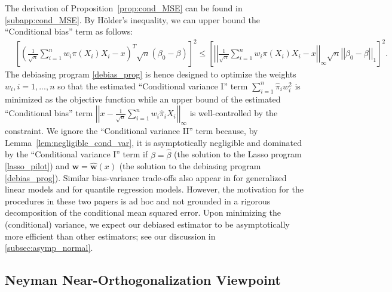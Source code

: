 \documentclass[ejsv2,noshowframe]{imsart}
\theoremstyle{plain}
\theoremstyle{definition}
\theoremstyle{remark}
\newcommand{\norm}[1]{\left|\left| #1 \right|\right|}
\renewcommand{\hat}{\widehat}
\begin{document}
The derivation of Proposition~\ref{prop:cond_MSE} can be found in \autoref{subapp:cond_MSE}. By H{\"o}lder's inequality, we can upper bound the ``Conditional bias'' term as follows:
\begin{align*}
	&\left[\left(\frac{1}{\sqrt{n}}\sum_{i=1}^n w_i \pi(X_i) X_i -x \right)^T \sqrt{n}\left(\beta_0 - \beta\right) \right]^2 \leq \left[\norm{\frac{1}{\sqrt{n}}\sum_{i=1}^n w_i \pi(X_i) X_i -x }_{\infty} \sqrt{n}\norm{\beta_0 - \beta}_1 \right]^2.
\end{align*}
The debiasing program \eqref{debias_prog} is hence designed to optimize the weights $w_i, i=1,...,n$ so that the estimated ``Conditional variance I'' term $\sum_{i=1}^n \hat{\pi}_i w_i^2$ is minimized as the objective function while an upper bound of the estimated ``Conditional bias'' term $\norm{x- \frac{1}{\sqrt{n}} \sum_{i=1}^n w_i\hat{\pi}_i X_i}_{\infty}$ is well-controlled by the constraint. We ignore the ``Conditional variance II'' term because, by Lemma~\ref{lem:negligible_cond_var}, it is asymptotically negligible and dominated by the ``Conditional variance I'' term if $\beta = \hat{\beta}$ (the solution to the Lasso program \eqref{lasso_pilot}) and $\bm{w}=\hat{\bm{w}}(x)$ (the solution to the debiasing program \eqref{debias_prog}). Similar bias-variance trade-offs also appear in \cite{cai2023statistical} for generalized linear models and \cite{giessing2021inference} for quantile regression models. However, the motivation for the procedures in these two papers is ad hoc and not grounded in a rigorous decomposition of the conditional mean squared error. Upon minimizing the (conditional) variance, we expect our debiased estimator to be asymptotically more efficient than other estimators; see our discussion in \autoref{subsec:asymp_normal}.


\subsection{Neyman Near-Orthogonalization Viewpoint}
\label{subsec:neyman_ortho}
\end{document}
